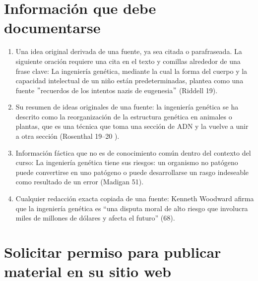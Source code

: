\section{Información que debe documentarse}
\begin{enumerate}[1.]
    \item Una idea original derivada de una fuente, ya sea citada o parafraseada. La siguiente oración requiere una cita en el texto y comillas alrededor de una frase clave: La ingeniería genética, mediante la cual la forma del cuerpo y la capacidad intelectual de un niño están predeterminadas, plantea como una fuente $"$recuerdos de los intentos nazis de eugenesia$"$ (Riddell 19).
    \item Su resumen de ideas originales de una fuente: la ingeniería genética se ha descrito como la reorganización de la estructura genética en animales o plantas, que es una técnica que toma una sección de ADN y la vuelve a unir a otra sección (Rosenthal 19–20 ). 
    \item Información fáctica que no es de conocimiento común dentro del contexto del curso: La ingeniería genética tiene sus riesgos: un organismo no patógeno puede convertirse en uno patógeno o puede desarrollarse un rasgo indeseable como resultado de un error (Madigan 51). 
    \item Cualquier redacción exacta copiada de una fuente: Kenneth Woodward afirma que la ingeniería genética es “una disputa moral de alto riesgo que involucra miles de millones de dólares y afecta el futuro” (68).
\end{enumerate}

\section{Solicitar permiso para publicar material en su sitio web}

